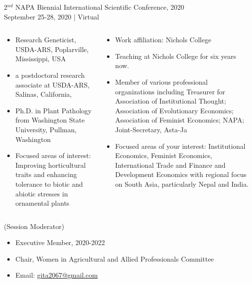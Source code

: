 \documentclass[dvipsnames,usenames]{beamer}
\begin{document}
\begin{frame}[plain,t]{\vskip2mm
2$^{nd}$ NAPA Biennial International Scientific Conference, 2020 \\[1cm]
September 25-28, 2020 | Virtual \\[1cm]}
\begin{block}
\begin{columns}
\begin{column}{0.22\textwidth}
\begin{itemize}
\item Research Geneticist, USDA-ARS, Poplarville, Mississippi, USA
\item a postdoctoral research associate at USDA-ARS, Salinas, California,
\item Ph.D. in Plant Pathology from Washington State University, Pullman, Washington
\item Focused areas of interest: Improving horticultural traits and enhancing tolerance to biotic and abiotic stresses in ornamental plants
\end{itemize}
\end{column}

\begin{column}{0.22\textwidth}
\begin{figure}
    \centering
\end{figure}

\begin{itemize}
\item Work affiliation: Nichols College
\item Teaching at Nichols College for six years now.
\item Member of various professional organizations including Treasurer for Association of Institutional Thought; Association of Evolutionary Economics; Association of Feminist Economics; NAPA; Joint-Secretary, Asta-Ja
\item Focused areas of your interest: Institutional Economics, Feminist Economics, International Trade and Finance and Development Economics with regional focus on South Asia, particularly Nepal and India.
\end{itemize}
\end{column}

\end{columns}

\vspace{1cm}

\begin{columns}
\begin{column}{0.22\textwidth}
\begin{figure}
    \centering
\end{figure}

(Session Moderator)
\begin{itemize}
\item Executive Member, 2020-2022
\item Chair, Women in Agricultural and Allied Professionals Committee
\item Email: \url{gita2067@gmail.com}
\end{itemize}
\end{column}
\end{columns}


\end{block}
\end{frame}
\end{document}
